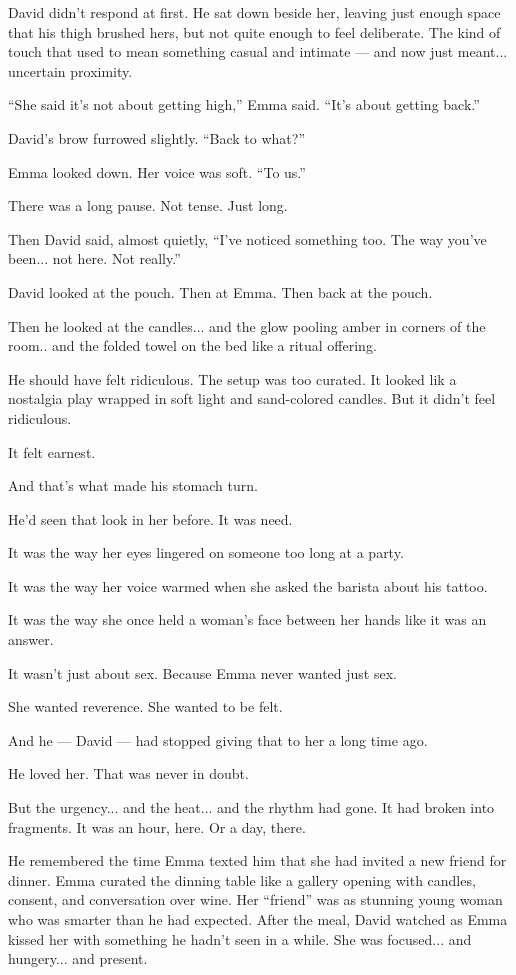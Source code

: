 David didn’t respond at first. He sat down beside her, leaving just enough space that his 
thigh brushed hers, but not quite enough to feel deliberate. The kind of touch that used to 
mean something casual and intimate — and now just meant... uncertain proximity.

``She said it’s not about getting high,'' Emma said. ``It’s about getting back.''

David’s brow furrowed slightly. ``Back to what?''

Emma looked down. Her voice was soft. ``To us.''

There was a long pause. Not tense. Just long.

Then David said, almost quietly, ``I’ve noticed something too. The way you’ve been... not here. 
Not really.''




David looked at the pouch. Then at Emma. Then back at the pouch.

Then he looked at the candles... and 
the glow pooling amber in corners of the room.. and 
the folded towel on the bed like a ritual offering.

He should have felt ridiculous.
The setup was too curated.
It looked lik a nostalgia play wrapped in soft light and sand-colored candles.
But it didn’t feel ridiculous.

It felt earnest.

And that’s what made his stomach turn.

He'd seen that look in her before.
It was need.

It was the way her eyes lingered on someone too long at a party.

It was the way her voice warmed when she asked the barista about his tattoo.

It was the way she once held a woman’s face between her hands like it was an answer.

It wasn’t just about sex.
Because Emma never wanted just sex.

She wanted reverence.
She wanted to be felt.

And he --- David --- had stopped giving that to her a long time ago.

He loved her. That was never in doubt.

But the urgency... and the heat... and the rhythm had gone.
It had broken into fragments.
It was an hour, here. Or a day, there.

He remembered the time Emma texted him that she had invited a new friend for dinner.
Emma curated the dinning table like a gallery opening with candles, consent, and conversation over wine.
Her ``friend'' was as stunning young woman who was smarter than he had expected.
After the meal, David watched as Emma kissed her with something he hadn’t seen in a while.
She was focused... and hungery... and present.

